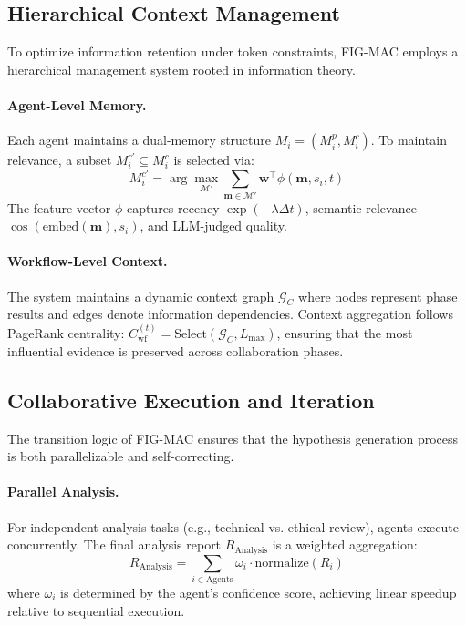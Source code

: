 \subsection{Hierarchical Context Management}
\label{sec:context}

To optimize information retention under token constraints, FIG-MAC employs a hierarchical management system rooted in information theory. 

\paragraph{Agent-Level Memory.}
Each agent maintains a dual-memory structure $M_i = (M_i^p, M_i^c)$. To maintain relevance, a subset $M_i^{c'} \subseteq M_i^c$ is selected via:
\begin{equation}
    M_i^{c'} = \arg\max_{\mathcal{M}'} \sum_{\mathbf{m} \in \mathcal{M}'} \mathbf{w}^\top \phi(\mathbf{m}, s_i, t)
\end{equation}
The feature vector $\phi$ captures recency $\exp(-\lambda \Delta t)$, semantic relevance $\cos(\text{embed}(\mathbf{m}), s_i)$, and LLM-judged quality.

\paragraph{Workflow-Level Context.}
The system maintains a dynamic context graph $\mathcal{G}_C$ where nodes represent phase results and edges denote information dependencies. Context aggregation follows PageRank centrality: $C_{\text{wf}}^{(t)} = \text{Select}(\mathcal{G}_C, L_{\max})$, ensuring that the most influential evidence is preserved across collaboration phases.

\subsection{Collaborative Execution and Iteration}
\label{sec:workflow}

The transition logic of FIG-MAC ensures that the hypothesis generation process is both parallelizable and self-correcting.

\paragraph{Parallel Analysis.}
For independent analysis tasks (e.g., technical vs. ethical review), agents execute concurrently. The final analysis report $R_{\text{Analysis}}$ is a weighted aggregation:
\begin{equation}
    R_{\text{Analysis}} = \sum_{i \in \text{Agents}} \omega_i \cdot \text{normalize}(R_i)
\end{equation}
where $\omega_i$ is determined by the agent's confidence score, achieving linear speedup relative to sequential execution.


